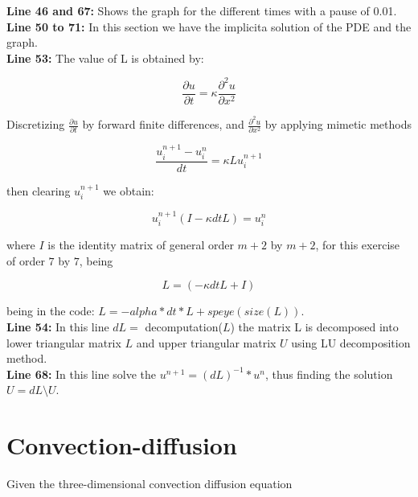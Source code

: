 \textbf{Line 46 and 67:} Shows the graph for the different times with a pause of 0.01. \\


\textbf{Line 50 to 71:} In this section we have the implicita solution of the PDE and the graph. \\

\textbf{Line 53:} The value of L is obtained by:

\begin{equation}
    \frac{\partial u}{\partial t} = \kappa \frac{\partial^{2} u}{\partial x^{2}}
\end{equation}

Discretizing $\frac{\partial u}{\partial t}$ by forward finite differences, and $\frac{\partial^{2} u}{\partial x^{2}}$ by applying mimetic methods

\begin{equation}
    \frac{u^{n+1}_{i} - u^{n}_{i} }{dt} = \kappa L 	u^{n+1}_{i}
\end{equation}

then clearing $u^{n+1}_{i}$ we obtain:


\begin{equation}
    u^{n+1}_{i}(I - \kappa dt L ) = u^{n}_{i}
\end{equation}

where $I$ is the identity matrix of general order $m+2$ by $m+2$, for this exercise of order $7$ by $7$, being

$$  L = (-\kappa dt L + I)$$

being in the code: $ L = -alpha*dt*L +speye(size(L))$.\\

\textbf{Line 54:} In this line $dL=$ decomputation($L$) the matrix L is decomposed into lower triangular matrix $L$ and upper triangular matrix $U$ using LU decomposition method.\\

\textbf{Line 68:} In this line solve the $u^{n+1} =(dL)^{-1}*u^{n}$, thus finding the solution $U=dL \setminus U$.\\



\section{Convection-diffusion}
Given the three-dimensional convection diffusion equation

